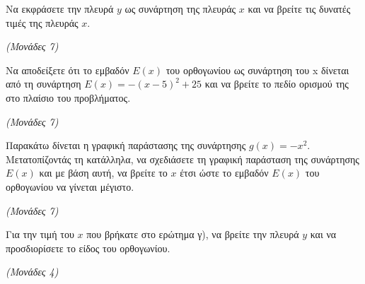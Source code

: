 \documentclass[11pt,a4paper,twoside]{book}
\newcommand{\monades}[1]{\hfill \textit{(Μονάδες #1)}}
\begin{document}
\begin{alist}
\item Να εκφράσετε την πλευρά $y$ ως συνάρτηση της πλευράς $x$ και να βρείτε τις δυνατές τιμές της πλευράς $x$.

\monades{7}

\item Να αποδείξετε ότι το εμβαδόν $E(x)$ του ορθογωνίου ως συνάρτηση του x δίνεται από τη συνάρτηση $E(x) = -(x - 5)^2 + 25$ και να βρείτε το πεδίο ορισμού της στο πλαίσιο του προβλήματος.

\monades{7}

\item Παρακάτω δίνεται η γραφική παράστασης της συνάρτησης $g(x) = -x^2$. Μετατοπίζοντάς τη κατάλληλα, να σχεδιάσετε τη γραφική παράσταση της συνάρτησης $E(x)$ και με βάση αυτή, να βρείτε το $x$ έτσι ώστε το εμβαδόν $E(x)$ του ορθογωνίου να γίνεται μέγιστο.

\monades{7}

\item Για την τιμή του $x$ που βρήκατε στο ερώτημα γ), να βρείτε την πλευρά $y$ και να προσδιορίσετε το είδος του ορθογωνίου.

\monades{4}

\begin{center}

\end{center}
\end{alist}
\end{document}

